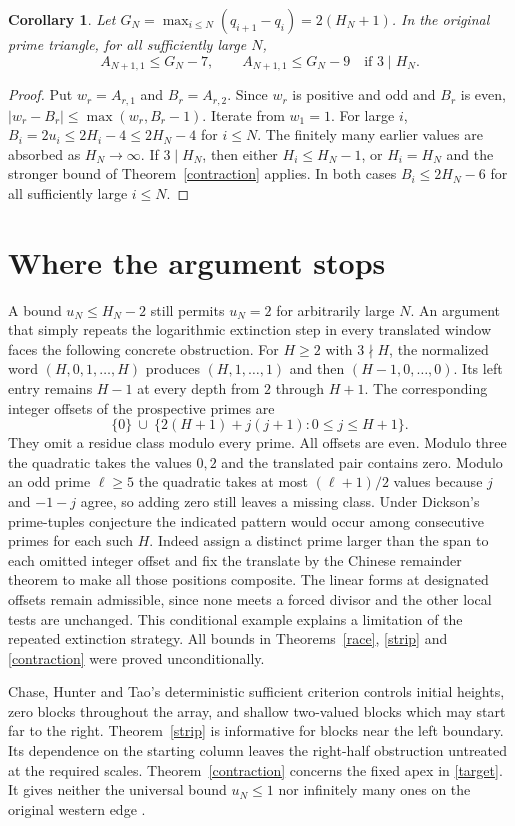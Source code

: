 \documentclass[11pt,a4paper]{article}
\newtheorem{corollary}[theorem]{Corollary}
\begin{document}
\begin{corollary}\label{wbound}
Let $G_N=\max_{i\le N}(q_{i+1}-q_i)=2(H_N+1)$. In the original prime triangle, for all sufficiently large $N$,
\[
 A_{N+1,1}\le G_N-7,\qquad
  A_{N+1,1}\le G_N-9\quad\text{if }3\mid H_N.
\]
\end{corollary}
\begin{proof}
Put $w_r=A_{r,1}$ and $B_r=A_{r,2}$. Since $w_r$ is positive and odd and $B_r$ is even, $|w_r-B_r|\le\max(w_r,B_r-1)$. Iterate from $w_1=1$. For large $i$, $B_i=2u_i\le2H_i-4\le2H_N-4$ for $i\le N$. The finitely many earlier values are absorbed as $H_N\to\infty$. If $3\mid H_N$, then either $H_i\le H_N-1$, or $H_i=H_N$ and the stronger bound of Theorem~\ref{contraction} applies. In both cases $B_i\le2H_N-6$ for all sufficiently large $i\le N$.
\end{proof}
\section{Where the argument stops}
A bound $u_N\le H_N-2$ still permits $u_N=2$ for arbitrarily large $N$. An argument that simply repeats the logarithmic extinction step in every translated window faces the following concrete obstruction. For $H\ge2$ with $3\nmid H$, the normalized word $(H,0,1,\ldots,H)$ produces $(H,1,\ldots,1)$ and then $(H-1,0,\ldots,0)$. Its left entry remains $H-1$ at every depth from $2$ through $H+1$.
\newpage
The corresponding integer offsets of the prospective primes are
\[
 \{0\}\ \cup\ \{2(H+1)+j(j+1):0\le j\le H+1\}.
\]
They omit a residue class modulo every prime. All offsets are even. Modulo three the quadratic takes the values $0,2$ and the translated pair contains zero. Modulo an odd prime $\ell\ge5$ the quadratic takes at most $(\ell+1)/2$ values because $j$ and $-1-j$ agree, so adding zero still leaves a missing class. Under Dickson's prime-tuples conjecture the indicated pattern would occur among consecutive primes for each such $H$. Indeed assign a distinct prime larger than the span to each omitted integer offset and fix the translate by the Chinese remainder theorem to make all those positions composite. The linear forms at designated offsets remain admissible, since none meets a forced divisor and the other local tests are unchanged. This conditional example explains a limitation of the repeated extinction strategy. All bounds in Theorems~\ref{race}, \ref{strip} and \ref{contraction} were proved unconditionally.

Chase, Hunter and Tao's deterministic sufficient criterion \cite[Thm.~1.6]{cht} controls initial heights, zero blocks throughout the array, and shallow two-valued blocks which may start far to the right. Theorem~\ref{strip} is informative for blocks near the left boundary. Its dependence on the starting column leaves the right-half obstruction untreated at the required scales. Theorem~\ref{contraction} concerns the fixed apex in \eqref{target}. It gives neither the universal bound $u_N\le1$ nor infinitely many ones on the original western edge \cite{bcz}.
\end{document}
